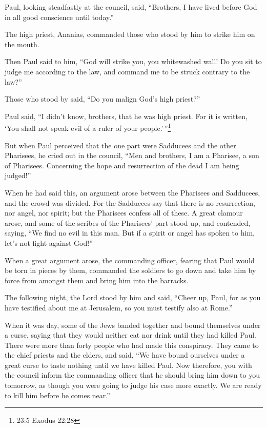  Paul, looking steadfastly at the council, said, ``Brothers,
I have lived before God in all good conscience until today.''

 The high priest, Ananias, commanded those who stood by him
to strike him on the mouth.

 Then Paul said to him, ``God will strike you, you
whitewashed wall! Do you sit to judge me according to the law, and
command me to be struck contrary to the law?''

 Those who stood by said, ``Do you malign God's high
priest?''

 Paul said, ``I didn't know, brothers, that he was high
priest. For it is written, `You shall not speak evil of a ruler of your
people.'\,''\footnote{23:5 Exodus 22:28}

 But when Paul perceived that the one part were Sadducees
and the other Pharisees, he cried out in the council, ``Men and
brothers, I am a Pharisee, a son of Pharisees. Concerning the hope and
resurrection of the dead I am being judged!''

 When he had said this, an argument arose between the
Pharisees and Sadducees, and the crowd was divided.  For the
Sadducees say that there is no resurrection, nor angel, nor spirit; but
the Pharisees confess all of these.  A great clamour arose,
and some of the scribes of the Pharisees' part stood up, and contended,
saying, ``We find no evil in this man. But if a spirit or angel has
spoken to him, let's not fight against God!''

 When a great argument arose, the commanding officer,
fearing that Paul would be torn in pieces by them, commanded the
soldiers to go down and take him by force from amongst them and bring
him into the barracks.

 The following night, the Lord stood by him and said,
``Cheer up, Paul, for as you have testified about me at Jerusalem, so
you must testify also at Rome.''

 When it was day, some of the Jews banded together and
bound themselves under a curse, saying that they would neither eat nor
drink until they had killed Paul.  There were more than
forty people who had made this conspiracy.  They came to
the chief priests and the elders, and said, ``We have bound ourselves
under a great curse to taste nothing until we have killed Paul.
 Now therefore, you with the council inform the commanding
officer that he should bring him down to you tomorrow, as though you
were going to judge his case more exactly. We are ready to kill him
before he comes near.''


